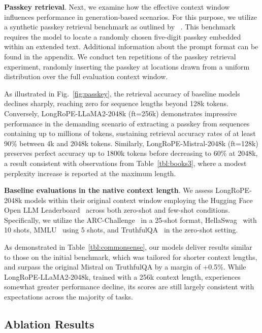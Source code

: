 \textbf{Passkey retrieval}. Next, we examine how the effective context window influences performance in generation-based scenarios. For this purpose, we utilize a synthetic passkey retrieval benchmark as outlined by ~\cite{passkey}. This benchmark requires the model to locate a randomly chosen five-digit passkey embedded within an extended text. Additional information about the prompt format can be found in the appendix. We conduct ten repetitions of the passkey retrieval experiment, randomly inserting the passkey at locations drawn from a uniform distribution over the full evaluation context window.

As illustrated in Fig.~\ref{fig:passkey}, the retrieval accuracy of baseline models declines sharply, reaching zero for sequence lengths beyond 128k tokens. Conversely, LongRoPE-LLaMA2-2048k (ft=256k) demonstrates impressive performance in the demanding scenario of extracting a passkey from sequences containing up to millions of tokens, sustaining retrieval accuracy rates of at least 90\% between 4k and 2048k tokens. Similarly, LongRoPE-Mistral-2048k (ft=128k) preserves perfect accuracy up to 1800k tokens before decreasing to 60\% at 2048k, a result consistent with observations from Table~\ref{tbl:books3}, where a modest perplexity increase is reported at the maximum length.

\textbf{Baseline evaluations in the native context length}. We assess LongRoPE-2048k models within their original context window employing the Hugging Face Open LLM Leaderboard~\cite{huggingfaceboard} across both zero-shot and few-shot conditions. Specifically, we utilize the ARC-Challenge~\cite{allenai:arc} in a 25-shot format, HellaSwag~\cite{zellers2019hellaswag} with 10 shots, MMLU~\cite{mmlu} using 5 shots, and TruthfulQA~\cite{lin2021truthfulqa} in the zero-shot setting.

As demonstrated in Table~\ref{tbl:commonsense}, our models deliver results similar to those on the initial benchmark, which was tailored for shorter context lengths, and surpass the original Mistral on TruthfulQA by a margin of +0.5\%. While LongRoPE-LLaMA2-2048k, trained with a 256k context length, experiences somewhat greater performance decline, its scores are still largely consistent with expectations across the majority of tasks.

\subsection{Ablation Results}

